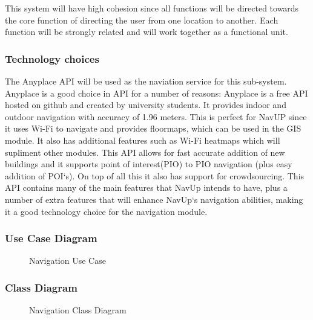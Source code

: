 	This system will have high cohesion since all functions will be directed towards the core function of directing the user from one location to another. Each function will be strongly related and will work together as a functional unit.

\subsubsection{Technology choices}
	The Anyplace API will be used as the naviation service for this sub-system. Anyplace is a good choice in API for a number of reasons: Anyplace is a free API hosted on github and created by university students. It provides indoor and outdoor navigation with accuracy of 1.96 meters. This is perfect for NavUP since it uses Wi-Fi to navigate and provides floormaps, which can be used in the GIS module. It also has additional features such as Wi-Fi heatmaps which will supliment other modules. This API allows for fast accurate addition of new buildings and it supports point of interest(PIO) to PIO navigation (plus easy addition of POI`s). On top of all this it also has support for crowdsourcing. This API contains many of the main features that NavUp intends to have, plus a number of extra features that will enhance NavUp`s navigation abilities, making it a good technology choice for the navigation module.

\subsubsection{Use Case Diagram}
	\begin{figure}[h!]
	\caption{Navigation Use Case}
	\end{figure}

\subsubsection{Class Diagram}
	\begin{figure}[h!]
	\caption{Navigation Class Diagram}
	\end{figure}

